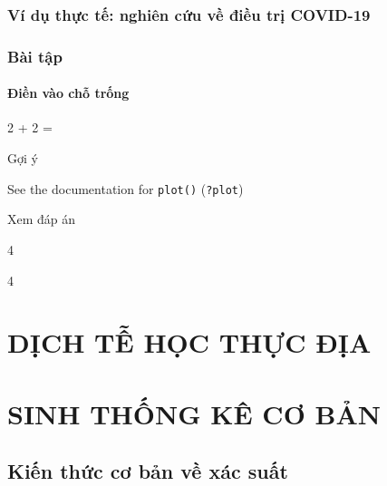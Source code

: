 \documentclass[
]{book}
\newenvironment{Shaded}{\begin{snugshade}}{\end{snugshade}}
\newcommand{\DecValTok}[1]{\textcolor[rgb]{0.00,0.00,0.81}{#1}}
\begin{document}
\hypertarget{vuxed-dux1ee5-thux1ef1c-tux1ebf-nghiuxean-cux1ee9u-vux1ec1-ux111iux1ec1u-trux1ecb-covid-19}{%
\section{Ví dụ thực tế: nghiên cứu về điều trị COVID-19}\label{vuxed-dux1ee5-thux1ef1c-tux1ebf-nghiuxean-cux1ee9u-vux1ec1-ux111iux1ec1u-trux1ecb-covid-19}}

\hypertarget{buxe0i-tux1eadp}{%
\section{Bài tập}\label{buxe0i-tux1eadp}}

\hypertarget{ux111iux1ec1n-vuxe0o-chux1ed7-trux1ed1ng}{%
\subsection{Điền vào chỗ trống}\label{ux111iux1ec1n-vuxe0o-chux1ed7-trux1ed1ng}}

2 + 2 =

Gợi ý

See the documentation for \texttt{plot()} (\texttt{?plot})

Xem đáp án

4

\begin{Shaded}
\begin{Highlighting}[]
\DecValTok{4}
\end{Highlighting}
\end{Shaded}

\hypertarget{part-dux1ecbch-tux1ec5-hux1ecdc-thux1ef1c-ux111ux1ecba}{%
\part{DỊCH TỄ HỌC THỰC ĐỊA}\label{part-dux1ecbch-tux1ec5-hux1ecdc-thux1ef1c-ux111ux1ecba}}

\hypertarget{part-sinh-thux1ed1ng-kuxea-cux1a1-bux1ea3n}{%
\part{SINH THỐNG KÊ CƠ BẢN}\label{part-sinh-thux1ed1ng-kuxea-cux1a1-bux1ea3n}}

\hypertarget{stkcb_xacsuat}{%
\chapter{Kiến thức cơ bản về xác suất}\label{stkcb_xacsuat}}
\end{document}
